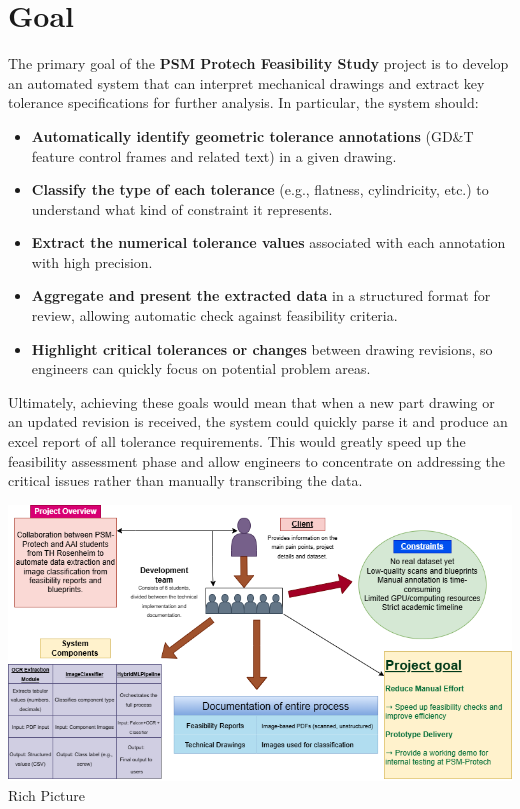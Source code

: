 \documentclass[11pt,a4paper]{article}
\begin{document}
\section{Goal}
The primary goal of the \textbf{PSM Protech Feasibility Study} project is to develop an automated system that can interpret mechanical drawings and extract key tolerance specifications for further analysis. In particular, the system should:
\begin{itemize}
  \item \textbf{Automatically identify geometric tolerance annotations} (GD\&T feature control frames and related text) in a given drawing.
  \item \textbf{Classify the type of each tolerance} (e.g., flatness, cylindricity, etc.) to understand what kind of constraint it represents.
  \item \textbf{Extract the numerical tolerance values} associated with each annotation with high precision.
  \item \textbf{Aggregate and present the extracted data} in a structured format for review, allowing automatic check against feasibility criteria.
  \item \textbf{Highlight critical tolerances or changes} between drawing revisions, so engineers can quickly focus on potential problem areas.
\end{itemize}

Ultimately, achieving these goals would mean that when a new part drawing or an updated revision is received, the system could quickly parse it and produce an excel report of all tolerance requirements. This would greatly speed up the feasibility assessment phase and allow engineers to concentrate on addressing the critical issues rather than manually transcribing the data.

\begin{center}
  \includegraphics[width=\textwidth]{Rich-Picure.drawio.png}\\[5mm]
    Rich Picture
\end{center}
\end{document}
